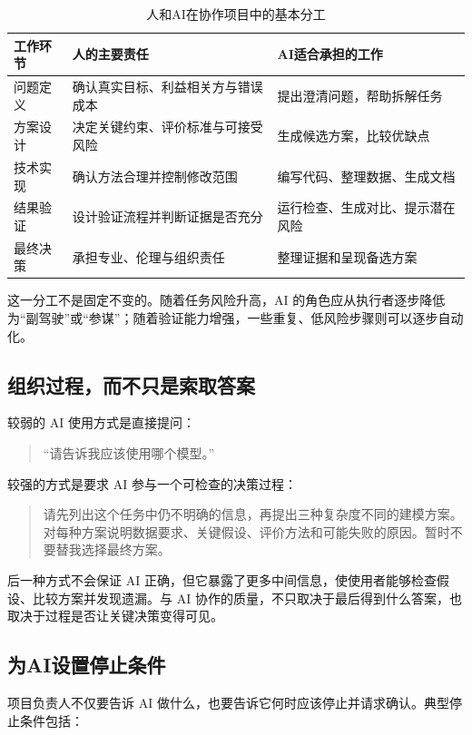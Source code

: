\begin{table}[H]
\centering
\caption{人和AI在协作项目中的基本分工}
\begin{tabular}{p{3.0cm}p{5.0cm}p{5.0cm}}
\toprule
工作环节 & 人的主要责任 & AI适合承担的工作 \\
\midrule
问题定义 & 确认真实目标、利益相关方与错误成本 & 提出澄清问题，帮助拆解任务 \\
方案设计 & 决定关键约束、评价标准与可接受风险 & 生成候选方案，比较优缺点 \\
技术实现 & 确认方法合理并控制修改范围 & 编写代码、整理数据、生成文档 \\
结果验证 & 设计验证流程并判断证据是否充分 & 运行检查、生成对比、提示潜在风险 \\
最终决策 & 承担专业、伦理与组织责任 & 整理证据和呈现备选方案 \\
\bottomrule
\end{tabular}
\end{table}

这一分工不是固定不变的。随着任务风险升高，AI 的角色应从执行者逐步降低为“副驾驶”或“参谋”；随着验证能力增强，一些重复、低风险步骤则可以逐步自动化。

\subsection{组织过程，而不只是索取答案}

较弱的 AI 使用方式是直接提问：

\begin{quote}
“请告诉我应该使用哪个模型。”
\end{quote}

较强的方式是要求 AI 参与一个可检查的决策过程：

\begin{quote}
请先列出这个任务中仍不明确的信息，再提出三种复杂度不同的建模方案。对每种方案说明数据要求、关键假设、评价方法和可能失败的原因。暂时不要替我选择最终方案。
\end{quote}

后一种方式不会保证 AI 正确，但它暴露了更多中间信息，使使用者能够检查假设、比较方案并发现遗漏。与 AI 协作的质量，不只取决于最后得到什么答案，也取决于过程是否让关键决策变得可见。

\subsection{为AI设置停止条件}

项目负责人不仅要告诉 AI 做什么，也要告诉它何时应该停止并请求确认。典型停止条件包括：

